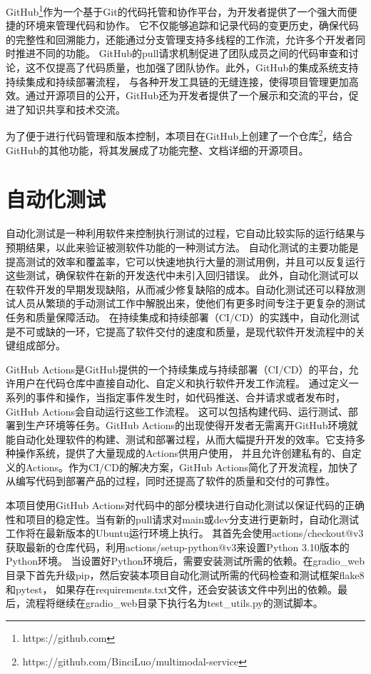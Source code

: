 \documentclass[a4paper,AutoFakeBold,oneside,12pt]{book}
\begin{document}
GitHub\footnote{https://github.com}作为一个基于Git的代码托管和协作平台，为开发者提供了一个强大而便捷的环境来管理代码和协作。
它不仅能够追踪和记录代码的变更历史，确保代码的完整性和回溯能力，还能通过分支管理支持多线程的工作流，允许多个开发者同时推进不同的功能。
GitHub的pull请求机制促进了团队成员之间的代码审查和讨论，这不仅提高了代码质量，也加强了团队协作。此外，GitHub的集成系统支持持续集成和持续部署流程，
与各种开发工具链的无缝连接，使得项目管理更加高效。通过开源项目的公开，GitHub还为开发者提供了一个展示和交流的平台，促进了知识共享和技术交流。

为了便于进行代码管理和版本控制，本项目在GitHub上创建了一个仓库\footnote{https://github.com/BinciLuo/multimodal-service}，结合GitHub的其他功能，将其发展成了功能完整、文档详细的开源项目。


\section{自动化测试}
自动化测试是一种利用软件来控制执行测试的过程，它自动比较实际的运行结果与预期结果，以此来验证被测软件功能的一种测试方法。
自动化测试的主要功能是提高测试的效率和覆盖率，它可以快速地执行大量的测试用例，并且可以反复运行这些测试，确保软件在新的开发迭代中未引入回归错误。
此外，自动化测试可以在软件开发的早期发现缺陷，从而减少修复缺陷的成本。自动化测试还可以释放测试人员从繁琐的手动测试工作中解脱出来，使他们有更多时间专注于更复杂的测试任务和质量保障活动。
在持续集成和持续部署（CI/CD）的实践中，自动化测试是不可或缺的一环，它提高了软件交付的速度和质量，是现代软件开发流程中的关键组成部分。

GitHub Actions是GitHub提供的一个持续集成与持续部署（CI/CD）的平台，允许用户在代码仓库中直接自动化、自定义和执行软件开发工作流程。
通过定义一系列的事件和操作，当指定事件发生时，如代码推送、合并请求或者发布时，GitHub Actions会自动运行这些工作流程。
这可以包括构建代码、运行测试、部署到生产环境等任务。GitHub Actions的出现使得开发者无需离开GitHub环境就能自动化处理软件的构建、测试和部署过程，从而大幅提升开发的效率。它支持多种操作系统，提供了大量现成的Actions供用户使用，
并且允许创建私有的、自定义的Actions。作为CI/CD的解决方案，GitHub Actions简化了开发流程，加快了从编写代码到部署产品的过程，同时还提高了软件的质量和交付的可靠性。

本项目使用GitHub Actions对代码中的部分模块进行自动化测试以保证代码的正确性和项目的稳定性。当有新的pull请求对main或dev分支进行更新时，自动化测试工作将在最新版本的Ubuntu运行环境上执行。
其首先会使用actions/checkout@v3获取最新的仓库代码，利用actions/setup-python@v3来设置Python 3.10版本的Python环境。
当设置好Python环境后，需要安装测试所需的依赖。在gradio\_web目录下首先升级pip，然后安装本项目自动化测试所需的代码检查和测试框架flake8和pytest，
如果存在requirements.txt文件，还会安装该文件中列出的依赖。最后，流程将继续在gradio\_web目录下执行名为test\_utils.py的测试脚本。
\end{document}
